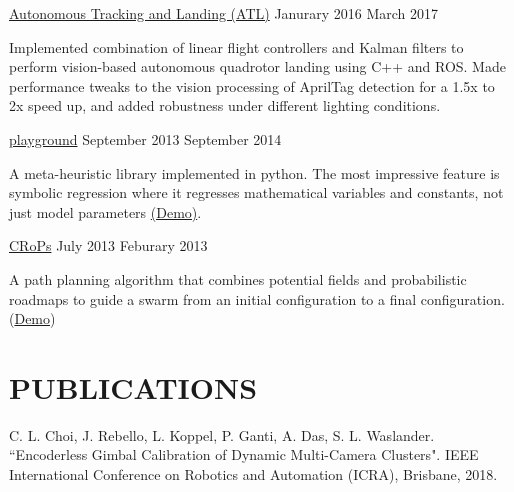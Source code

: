 \documentclass[line,margin]{cv}
\begin{document}
\begin{resume}
\href{https://www.youtube.com/watch?v=5EP2ndrXJN}
{Autonomous Tracking and Landing (ATL)}
\hfill Janurary 2016 \textemdash{} March 2017

\vspace{0.1em}
\begin{adjustwidth}{2.0em}{2.0em}
	Implemented combination of linear flight controllers and Kalman filters to perform
	vision-based autonomous quadrotor landing using C++ and ROS. Made performance 
	tweaks to the vision processing of AprilTag detection for a 1.5x to 2x speed up, 
	and added robustness under different lighting conditions.
\end{adjustwidth}


\href{http://chutsu.github.io/playground}{playground}
\hfill September 2013 \textemdash{} September 2014

\vspace{0.1em}
\begin{adjustwidth}{2.0em}{2.0em}
    A meta-heuristic library implemented in python. The most impressive feature 
    is symbolic regression where it regresses mathematical variables and constants, 
    not just model parameters 
    \href{https://www.youtube.com/watch?v=dPjBrLjSBl4}{(Demo)}.
\end{adjustwidth}

\href{https://github.com/wallarelvo/CRoPS}{CRoPs}
\hfill July 2013 \textemdash{} Feburary 2013

\vspace{0.1em}
\begin{adjustwidth}{2.0em}{2.0em}
    A path planning algorithm that combines potential fields and probabilistic
    roadmaps to guide a swarm from an initial configuration to a final
    configuration. (\href{https://www.youtube.com/watch?v=XTZ82zrKzEU}{Demo})
\end{adjustwidth}



\section{PUBLICATIONS} 

\begin{adjustwidth}{2.0em}{2.0em}
	C. L. Choi, J. Rebello, L. Koppel, P. Ganti, A. Das, S. L. Waslander. 
	``Encoderless Gimbal Calibration of Dynamic Multi-Camera Clusters". 
	IEEE International Conference on Robotics and Automation (ICRA), 
	Brisbane, 2018.
\end{adjustwidth}




\end{resume}
\end{document}
